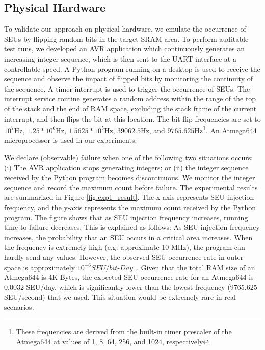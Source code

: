 \subsection{Physical Hardware}
To validate our approach on physical hardware, we emulate the occurrence of SEUs by flipping random bits in the target SRAM area. To perform auditable test runs, we developed an AVR application which continuously generates an increasing integer sequence, which is then sent to the UART interface at a controllable speed. A Python program running on a desktop is used to receive the sequence and observe the impact of flipped bits by monitoring the continuity of the sequence. A timer interrupt is used to trigger the occurrence of SEUs. The interrupt service routine generates a random address within the range of the top of the stack and the end of RAM space, excluding the stack frame of the current interrupt, and then flips the bit at this location. The bit flip frequencies are set to $10^7$Hz, $1.25*10^6$Hz, $1.5625*10^5$Hz, $39062.5$Hz, and $9765.625$Hz\footnote{These frequencies are derived from the built-in timer prescaler of the Atmega644 at values of 1, 8, 64, 256, and 1024, respectively}. An Atmega644 microprocessor is used in our experiments.

We declare (observable) failure when one of the following two situations occurs: (i) The AVR application stops generating integers; or (ii) the integer sequence received by the Python program becomes discontinuous. We monitor the integer sequence and record the maximum count before failure. The experimental results are summarized in Figure \ref{fig:exp1_result}. The x-axis represents SEU injection frequency, and the y-axis represents the maximum count received by the Python program. The figure shows that as SEU injection frequency increases, running time to failure decreases. This is explained as follows: As SEU injection frequency increases, the probability that an SEU occurs in a critical area increases. When the frequency is extremely high (e.g. approximate 10 MHz), the program can hardly send any values. However, the observed SEU occurrence rate in outer space is approximately $10^{-6}SEU/bit$-$Day$~\cite{underwood1992observations}. Given that the total RAM size of an Atmega644 is 4K Bytes, the expected SEU occurrence rate for an Atmega644 is 0.0032 SEU/day, which is significantly lower than the lowest frequency (9765.625 SEU/second) that we used. This situation would be extremely rare in real scenarios.

